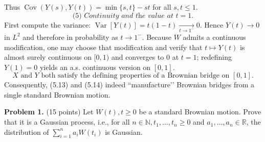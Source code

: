 \documentclass{article}
\begin{document}
{\[\]
Thus $\operatorname{Cov}(Y(s),Y(t))=\min\{s,t\}-st$ for all $s,t\le1$.
\[
\textit{(5)  Continuity and the value at }t=1.
\]
First compute the variance: $\operatorname{Var}[Y(t)]=t(1-t)\xrightarrow[t\to1^-]{}0$.  
Hence $Y(t)\to0$ in $L^2$ and therefore in probability as $t\to1^-$.  
Because $W$ admits a continuous modification, one may choose that modification and verify that $t\mapsto Y(t)$ is almost surely continuous on $[0,1)$ and converges to $0$ at $t=1$; redefining $Y(1)=0$ yields an a.s. continuous version on $[0,1]$. \\
\bigskip
\[
\boxed{\; X\text{ and }Y\text{ both satisfy the defining properties of a Brownian bridge on }[0,1].\;}
\]
Consequently, (5.13) and (5.14) indeed “manufacture’’ Brownian bridges from a single standard Brownian motion.
}




\textbf{Problem 1.} (15 points) 
Let $W(t), t \geq 0$ be a standard
Brownian motion. Prove that it is a Gaussian process, i.e., for all
$n \in \mathbb{N}, t_1, \dots, t_n \geq 0$ and $a_1, \dots, a_n \in
\mathbb{R}$, the distribution of $\sum_{i=1}^{n} a_i W(t_i)$ is
Gaussian.
\end{document}

